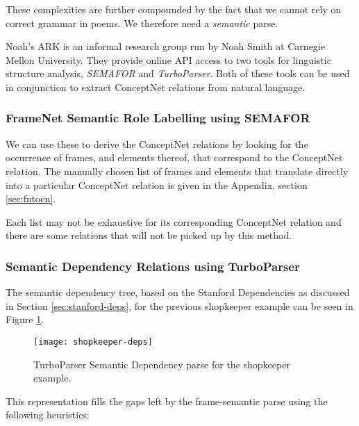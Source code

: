 These complexities are further compounded by the fact that we cannot rely on correct grammar in poems. We therefore need a \textit{semantic} parse. 

Noah's ARK is an informal research group run by Noah Smith at Carnegie Mellon University\cite{ark}. They provide online API access to two tools for linguistic structure analysis, \textit{SEMAFOR}\cite{chen2010semafor} and \textit{TurboParser}\cite{turboparser}. Both of these tools can be used in conjunction to extract ConceptNet relations from natural language.

\subsubsection{FrameNet Semantic Role Labelling using SEMAFOR}
\label{sec:sema}

We can use these to derive the ConceptNet relations by looking for the occurrence of frames, and elements thereof, that correspond to the ConceptNet relation. The manually chosen list of frames and elements that translate directly into a particular ConceptNet relation is given in the Appendix, section \ref{sec:fntocn}.

Each list may not be exhaustive for its corresponding ConceptNet relation and there are some relations that will not be picked up by this method.


\subsubsection{Semantic Dependency Relations using TurboParser}
\label{sec:turbo}

The semantic dependency tree, based on the Stanford Dependencies as discussed in Section \ref{sec:stanford-deps}, for the previous shopkeeper example can be seen in Figure \ref{fig:shopkeeper-deps}.

\begin{figure}[h!]
\centering
\texttt{[image: shopkeeper-deps]}
\caption{TurboParser Semantic Dependency parse for the shopkeeper example.}
\label{fig:shopkeeper-deps}
\end{figure}

This representation fills the gaps left by the frame-semantic parse using the following heuristics:

